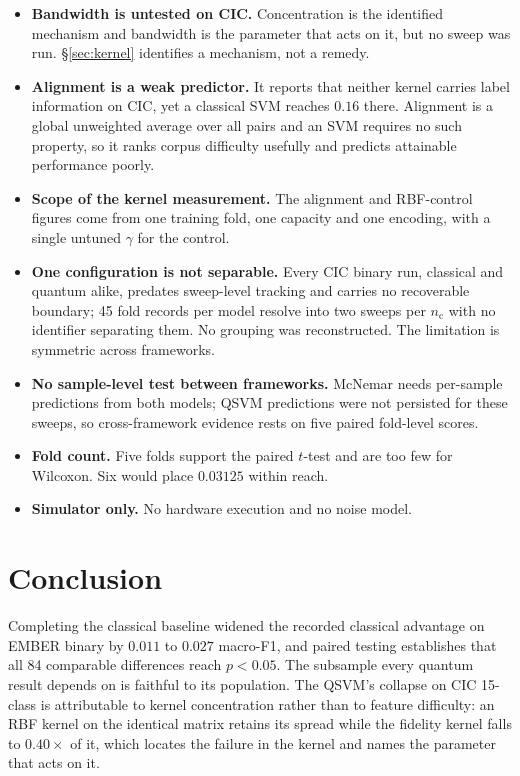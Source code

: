 \documentclass[10pt]{article}
\newcommand{\nc}{\ensuremath{n_{\mathrm{c}}}}
\begin{document}
\begin{itemize}
\item \textbf{Bandwidth is untested on CIC.} Concentration is the identified
mechanism and bandwidth is the parameter that acts on it, but no sweep was run.
§\ref{sec:kernel} identifies a mechanism, not a remedy.
\item \textbf{Alignment is a weak predictor.} It reports that neither kernel
carries label information on CIC, yet a classical SVM reaches $0.16$ there.
Alignment is a global unweighted average over all pairs and an SVM requires no
such property, so it ranks corpus difficulty usefully and predicts attainable
performance poorly.
\item \textbf{Scope of the kernel measurement.} The alignment and RBF-control
figures come from one training fold, one capacity and one encoding, with a single
untuned $\gamma$ for the control.
\item \textbf{One configuration is not separable.} Every CIC binary run,
classical and quantum alike, predates sweep-level tracking and carries no
recoverable boundary; 45 fold records per model resolve into two sweeps per \nc{}
with no identifier separating them. No grouping was reconstructed. The limitation
is symmetric across frameworks.
\item \textbf{No sample-level test between frameworks.} McNemar needs per-sample
predictions from both models; QSVM predictions were not persisted for these
sweeps, so cross-framework evidence rests on five paired fold-level scores.
\item \textbf{Fold count.} Five folds support the paired $t$-test and are too few
for Wilcoxon. Six would place $0.03125$ within reach.
\item \textbf{Simulator only.} No hardware execution and no noise model.
\end{itemize}

\section{Conclusion}

Completing the classical baseline widened the recorded classical advantage on
EMBER binary by $0.011$ to $0.027$ macro-F1, and paired testing establishes that
all 84 comparable differences reach $p<0.05$. The subsample every quantum result
depends on is faithful to its population. The QSVM's collapse on CIC 15-class is
attributable to kernel concentration rather than to feature difficulty: an RBF
kernel on the identical matrix retains its spread while the fidelity kernel falls
to $0.40\times$ of it, which locates the failure in the kernel and names the
parameter that acts on it.
\end{document}
